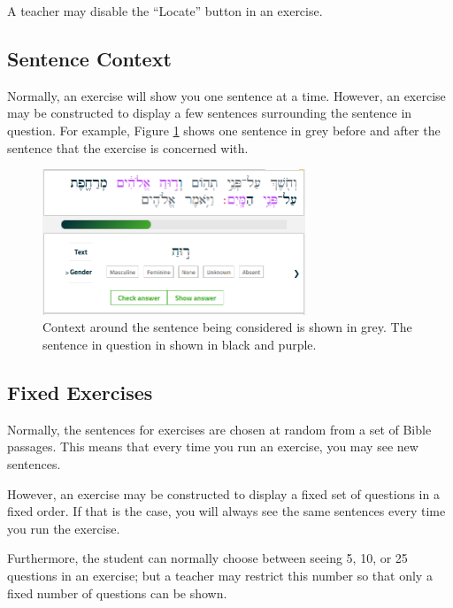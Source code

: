 \documentclass[11pt,oneside,a4paper]{memoir}
\begin{document}
A teacher may disable the ``Locate'' button in an exercise.


\subsection{Sentence Context}\label{sec-sentence-context}

Normally, an exercise will show you one sentence at a time. However, an exercise may be constructed
to display a few sentences surrounding the sentence in question. For example, Figure
\ref{fig-context} shows one sentence in grey before and after the sentence that the exercise is
concerned with.

\begin{figure}
  \begin{center}
    \includegraphics[width=0.7\textwidth]{fig-context.png}
  \end{center}
  \caption{Context around the sentence being considered is shown in grey. The sentence in question
    in shown in black and purple.}\label{fig-context}
\end{figure}


\subsection{Fixed Exercises}\label{sec-fixed-exercises}

Normally, the sentences for exercises are chosen at random from a set of Bible passages. This means
that every time you run an exercise, you may see new sentences.

However, an exercise may be constructed to display a fixed set of questions in a fixed order. If
that is the case, you will always see the same sentences every time you run the exercise.

Furthermore, the student can normally choose between seeing 5, 10, or 25 questions in an exercise;
but a teacher may restrict this number so that only a fixed number of questions can be shown.
\end{document}

